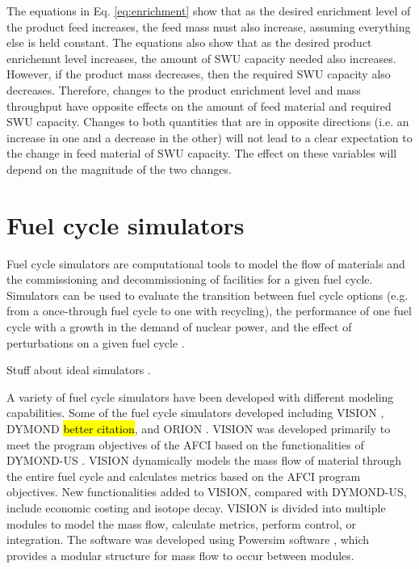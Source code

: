 The equations in Eq. \ref{eq:enrichment} show that as the desired enrichment level 
of the product feed increases, the feed mass must also increase, assuming everything 
else is held constant. The equations also show that as the desired product 
enrichemnt level increases, the amount of \gls{SWU} capacity needed also increases. 
However, if the product mass decreases, then the required \gls{SWU} capacity 
also decreases. Therefore, changes to the product enrichment level and mass 
throughput have opposite effects on the amount of feed material and required 
\gls{SWU} capacity. Changes to both quantities that are in opposite directions 
(i.e. an increase in one and a decrease in the other) will not lead to a clear 
expectation to the change in feed material of \gls{SWU} capacity. The effect 
on these variables will depend on the magnitude of the two changes.

\section{Fuel cycle simulators}
Fuel cycle simulators are computational tools to model the flow of materials
and the commissioning and decommissioning of facilities for a given fuel 
cycle. Simulators can be used to evaluate the transition between fuel cycle 
options (e.g. from a once-through fuel cycle to one with recycling), the 
performance of one fuel cycle with a growth in the demand of nuclear power, 
and the effect of perturbations on a given fuel cycle \cite{piet_dynamic_2011}. 

Stuff about ideal simulators \cite{huff_next_2010,brown_identification_2016}.

A variety of fuel cycle simulators have been developed with different modeling 
capabilities. Some of the fuel cycle simulators developed including VISION 
\cite{yacout_visionverifiable_2006}, 
DYMOND \hl{better citation}, and ORION \cite{gregg_analysis_2012}. 
VISION was developed primarily to meet the program objectives of the 
\gls{AFCI} based on the functionalities of DYMOND-US \cite{yacout_visionverifiable_2006}.
VISION dynamically models the mass flow of material through the 
entire fuel cycle and calculates metrics based on the \gls{AFCI} program 
objectives. New functionalities added to VISION, compared with DYMOND-US, 
include economic costing and isotope decay. VISION is divided into multiple 
modules to model the mass flow, calculate metrics, perform control, or 
integration. The software was developed using Powersim software \cite{powersim_powersim_nodate},
which provides a modular structure for mass flow to occur between modules. 

